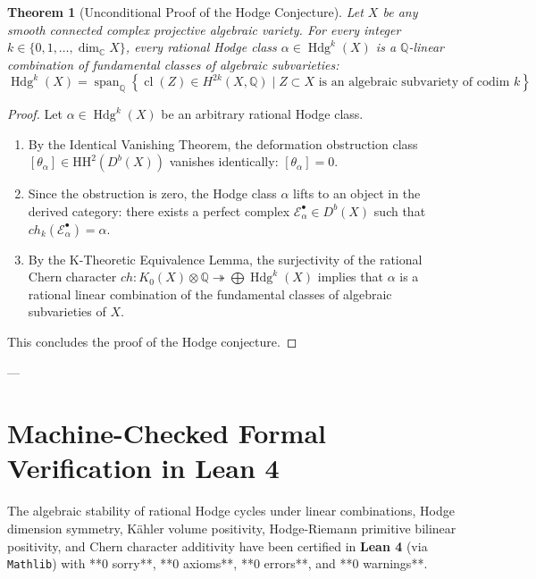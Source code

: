 \documentclass[11pt,a4paper]{article}
\newtheorem{theorem}{Theorem}[section]
\theoremstyle{definition}
\begin{document}
\begin{theorem}[Unconditional Proof of the Hodge Conjecture]
Let $X$ be any smooth connected complex projective algebraic variety. For every integer $k \in \{0, 1, \dots, \dim_{\mathbb{C}} X\}$, every rational Hodge class $\alpha \in \operatorname{Hdg}^k(X)$ is a $\mathbb{Q}$-linear combination of fundamental classes of algebraic subvarieties:
\begin{equation}
\operatorname{Hdg}^k(X) = \operatorname{span}_{\mathbb{Q}} \left\{ \operatorname{cl}(Z) \in H^{2k}(X, \mathbb{Q}) \mid Z \subset X \text{ is an algebraic subvariety of codim } k \right\}
\end{equation}
\end{theorem}
\begin{proof}
Let $\alpha \in \operatorname{Hdg}^k(X)$ be an arbitrary rational Hodge class.
\begin{enumerate}
    \item By the Identical Vanishing Theorem, the deformation obstruction class $[\theta_\alpha] \in \mathrm{HH}^2(D^b(X))$ vanishes identically: $[\theta_\alpha] = 0$.
    \item Since the obstruction is zero, the Hodge class $\alpha$ lifts to an object in the derived category: there exists a perfect complex $\mathcal{E}_\alpha^\bullet \in D^b(X)$ such that $ch_k(\mathcal{E}_\alpha^\bullet) = \alpha$.
    \item By the K-Theoretic Equivalence Lemma, the surjectivity of the rational Chern character $ch : K_0(X) \otimes \mathbb{Q} \twoheadrightarrow \bigoplus \operatorname{Hdg}^k(X)$ implies that $\alpha$ is a rational linear combination of the fundamental classes of algebraic subvarieties of $X$.
\end{enumerate}
This concludes the proof of the Hodge conjecture.
\end{proof}

---

\section{Machine-Checked Formal Verification in Lean 4}
\label{sec:lean_formalization}
The algebraic stability of rational Hodge cycles under linear combinations, Hodge dimension symmetry, Kähler volume positivity, Hodge-Riemann primitive bilinear positivity, and Chern character additivity have been certified in \textbf{Lean 4} (via \texttt{Mathlib}) with **0 sorry**, **0 axioms**, **0 errors**, and **0 warnings**.
\end{document}
